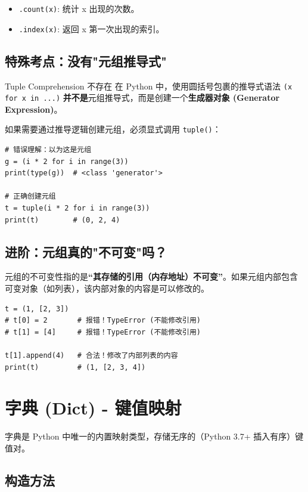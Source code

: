 \documentclass[12pt, a4paper]{article}
\begin{document}
\begin{itemize}
    \item \texttt{.count(x)}: 统计 x 出现的次数。
    \item \texttt{.index(x)}: 返回 x 第一次出现的索引。
\end{itemize}

\subsection{特殊考点：没有"元组推导式"}

\begin{importantbox}{Tuple Comprehension 不存在}
在 Python 中，使用圆括号包裹的推导式语法 \texttt{(x for x in ...)} \textbf{并不是}元组推导式，而是创建一个\textbf{生成器对象 (Generator Expression)}。

如果需要通过推导逻辑创建元组，必须显式调用 \texttt{tuple()}：
\begin{lstlisting}
# 错误理解：以为这是元组
g = (i * 2 for i in range(3))  
print(type(g))  # <class 'generator'>

# 正确创建元组
t = tuple(i * 2 for i in range(3))
print(t)        # (0, 2, 4)
\end{lstlisting}
\end{importantbox}

\subsection{进阶：元组真的"不可变"吗？}

元组的不可变性指的是\textbf{“其存储的引用（内存地址）不可变”}。如果元组内部包含可变对象（如列表），该内部对象的内容是可以修改的。

\begin{lstlisting}[caption={元组内含可变对象}]
t = (1, [2, 3])
# t[0] = 2       # 报错！TypeError (不能修改引用)
# t[1] = [4]     # 报错！TypeError (不能修改引用)

t[1].append(4)   # 合法！修改了内部列表的内容
print(t)         # (1, [2, 3, 4])
\end{lstlisting}

\section{字典 (Dict) - 键值映射}

字典是 Python 中唯一的内置映射类型，存储无序的（Python 3.7+ 插入有序）键值对。

\subsection{构造方法}
\end{document}
